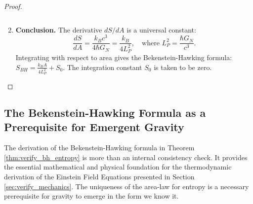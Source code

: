 \documentclass[11pt, letterpaper]{report}
\theoremstyle{plain} %
\theoremstyle{definition} %
\theoremstyle{remark} %
\begin{document}
\begin{proof}
\begin{enumerate}
\begin{equation}
    \end{equation}
    \item \textbf{Conclusion.} The derivative $dS/dA$ is a universal constant:
    \begin{equation}
        \frac{dS}{dA} = \frac{k_B c^3}{4\hbar G_N} = \frac{k_B}{4 L_P^2}, \quad \text{where } L_P^2 = \frac{\hbar G_N}{c^3}.
    \end{equation}
    Integrating with respect to area gives the Bekenstein-Hawking formula: $S_{BH} = \frac{k_B A}{4 L_P^2} + S_0$. The integration constant $S_0$ is taken to be zero.
\end{enumerate}
\end{proof}

\subsection{The Bekenstein-Hawking Formula as a Prerequisite for Emergent Gravity}
\label{subsec:bh_as_prereq}

The derivation of the Bekenstein-Hawking formula in Theorem \ref{thm:verify_bh_entropy} is more than an internal consistency check. It provides the essential mathematical and physical foundation for the thermodynamic derivation of the Einstein Field Equations presented in Section \ref{sec:verify_mechanics}. The uniqueness of the area-law for entropy is a necessary prerequisite for gravity to emerge in the form we know it.
\end{document}
